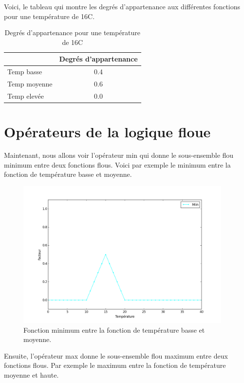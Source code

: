 \documentclass[a4paper,11pt]{article}
\begin{document}
Voici, le tableau qui montre les degrés d'appartenance aux différentes 
fonctions pour une température de 16\degre C.

\begin{table}[H]
  \caption{Degrés d'appartenance pour une température de 16\degre C}

  \begin{center}
    \begin{tabular}{|l|c|}
      \hline
       & Degrés d'appartenance \\
      \hline
      \hline
      Temp basse & 0.4 \\
      \hline
      Temp moyenne & 0.6 \\
      \hline
      Temp elevée & 0.0\\
      \hline
    \end{tabular}
  \end{center}
\end{table}


\section{Opérateurs de la logique floue}

Maintenant, nous allons voir l'opérateur min qui donne le sous-ensemble 
flou minimum entre deux fonctions flous. Voici par exemple le 
minimum entre la fonction de température basse et moyenne.

\begin{figure}[H]
  \begin{center}
  \includegraphics[height=280px]{images/min.png}
  \caption{Fonction minimum entre la fonction de température basse et moyenne.}
  \end{center}
\end{figure}

Ensuite, l'opérateur max donne le sous-ensemble flou maximum 
entre deux fonctions flous. Par exemple le maximum entre la 
fonction de température moyenne et haute.
\end{document}

